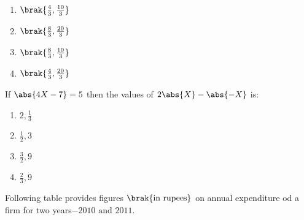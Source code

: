 \begin{enumerate}
    \item $\brak{\frac{4}{3},\frac{10}{3}}$
    \item $\brak{\frac{8}{3},\frac{20}{3}}$
    \item $\brak{\frac{8}{3},\frac{10}{3}}$
    \item $\brak{\frac{4}{3},\frac{20}{3}}$
\end{enumerate}
\item If $\abs{4X - 7} = 5$ then the values of $2\abs{X} - \abs{-X}$ is:
\begin{multicols}{4}
\begin{enumerate}
    \item $2,\frac{1}{3}$
    \item $\frac{1}{2},3$
    \item $\frac{3}{2},9$
    \item $\frac{2}{3},9$
\end{enumerate}
\end{multicols}
\item Following table provides figures $\brak{\text{in rupees}}$ on annual expenditure od a firm for two years$-2010 \text{ and } 2011$.\\

